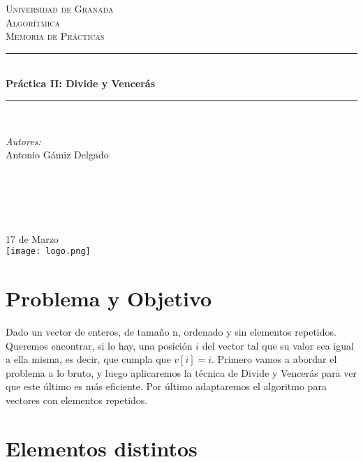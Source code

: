 \documentclass[11pt]{article}
\begin{document}
\begin{titlepage}
\newcommand{\HRule}{\rule{\linewidth}{0.5mm}}
\center
\textsc{\LARGE Universidad de Granada}\\[1.5cm] %
\textsc{\Large Algorítmica}\\[0.5cm] %
\textsc{\large Memoria de Prácticas}\\[0.5cm] %
\HRule \\[0.4cm]
{ \huge \bfseries Práctica II: Divide y Vencerás}\\[0.4cm] %
\HRule \\[1.5cm]
\begin{minipage}{0.4\textwidth}
\begin{flushleft} \large
\emph{Autores:}\\
Antonio Gámiz Delgado\textsc{} %
\end{flushleft}
\end{minipage}
~
\begin{minipage}{0.4\textwidth}
\begin{flushright} \large
\emph{} \\
\textsc{} %
\end{flushright}
\end{minipage}\\[2cm]
{\large 17 de Marzo}\\[2cm] %
\texttt{[image: logo.png]}\\[1cm]
\vfill %
\end{titlepage}

\section{Problema y Objetivo}
Dado un vector de enteros, de tamaño n, ordenado y sin elementos repetidos. Queremos encontrar, si lo hay, una posición $i$ del vector tal que su valor sea igual a ella misma, es decir, que cumpla que $v[i]=i$.
Primero vamos a abordar el problema a lo bruto, y luego aplicaremos la técnica de Divide y Vencerás para ver que este último es más eficiente.
Por último adaptaremos el algoritmo para vectores con elementos repetidos.

\section{Elementos distintos}
\end{document}
